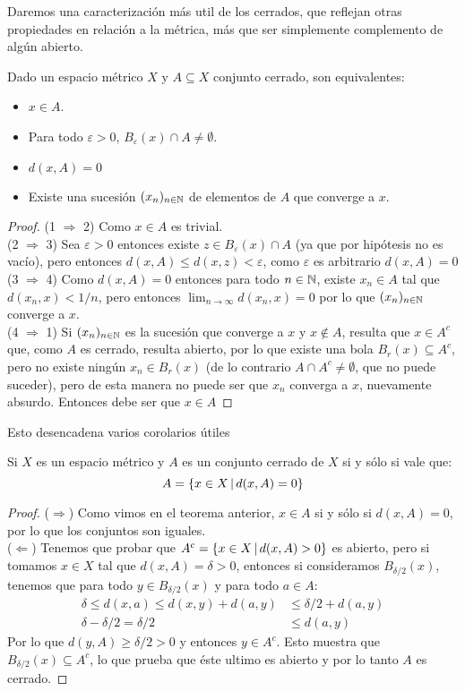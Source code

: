 \documentclass[12pt,a4paper]{book}
\begin{document}
Daremos una caracterización más util de los cerrados, que reflejan otras propiedades en relación a la métrica, más que ser simplemente complemento de algún abierto.
\begin{prop} Dado un espacio métrico $X$ y $A \subseteq X$ conjunto cerrado, son equivalentes:
\begin{itemize}
\item $x \in A$.
\item Para todo $\varepsilon > 0$, $B_\varepsilon(x) \cap A \neq \emptyset$.
\item $d(x,A)=0$
\item Existe una sucesión $(x_n)_{{n} \in \mathbb{N}}$ de elementos de $A$ que converge a $x$.
\end{itemize}
\begin{proof}
(1 $\Rightarrow$ 2) Como $x \in A$ es trivial.\\
(2 $\Rightarrow$ 3) Sea $\varepsilon >0$ entonces existe $z \in B_\varepsilon(x) \cap A$ (ya que por hipótesis no es vacío), pero entonces $d(x,A) \leq d(x,z) < \varepsilon$, como $\varepsilon$ es arbitrario $d(x,A) = 0$\\
(3 $\Rightarrow$ 4) Como $d(x,A)=0$ entonces para todo ${{n} \in \mathbb{N}}$, existe $x_n \in A$ tal que $d(x_n,x) < 1/n$, pero entonces $\lim_{n \to \infty} d(x_n,x) = 0$ por lo que $(x_n)_{{n} \in \mathbb{N}}$ converge a $x$.\\
(4 $\Rightarrow$ 1) Si $(x_n)_{{n} \in \mathbb{N}}$ es la sucesión que converge a $x$ y $x \notin A$, resulta que $x \in A^c$ que, como $A$ es cerrado, resulta abierto, por lo que existe una bola $B_r(x) \subseteq A^c$, pero no existe ningún $x_n \in B_r(x)$ (de lo contrario $A \cap A^c \neq \emptyset$, que no puede suceder), pero de esta manera no puede ser que $x_n$ converga a $x$, nuevamente absurdo. Entonces debe ser que $x \in A$
\end{proof}
\end{prop}
Esto desencadena varios corolarios útiles
\begin{cor} Si $X$ es un espacio métrico y $A$ es un conjunto cerrado de $X$ si y sólo si vale que:
$$ A = \{ x \in X \,\vert\, d(x,A)=0\}$$
\begin{proof}
($\Rightarrow$) Como vimos en el teorema anterior, $x \in A$ si y sólo si $d(x,A)=0$, por lo que los conjuntos son iguales.\\
($\Leftarrow$) Tenemos que probar que $A^c = \{ x \in X \,\vert\, d(x,A)>0\}$ es abierto, pero si tomamos $x \in X$ tal que $d(x,A)=\delta > 0$, entonces si consideramos $B_{\delta/2}(x)$, tenemos que para todo $y \in B_{\delta/2}(x)$ y para todo $a \in A$:
\begin{align*}
\delta \leq d(x,a) \leq d(x,y) + d(a,y) &\leq \delta/2 + d(a,y)\\
\delta - \delta/2 = \delta/2 &\leq d(a,y)
\end{align*}
Por lo que $d(y,A) \geq \delta/2 >0$ y entonces $y \in A^c$. Esto muestra que $B_{\delta/2}(x) \subseteq A^c$, lo que prueba que éste ultimo es abierto y por lo tanto $A$ es cerrado.
\end{proof}
\end{cor}
\end{document}
